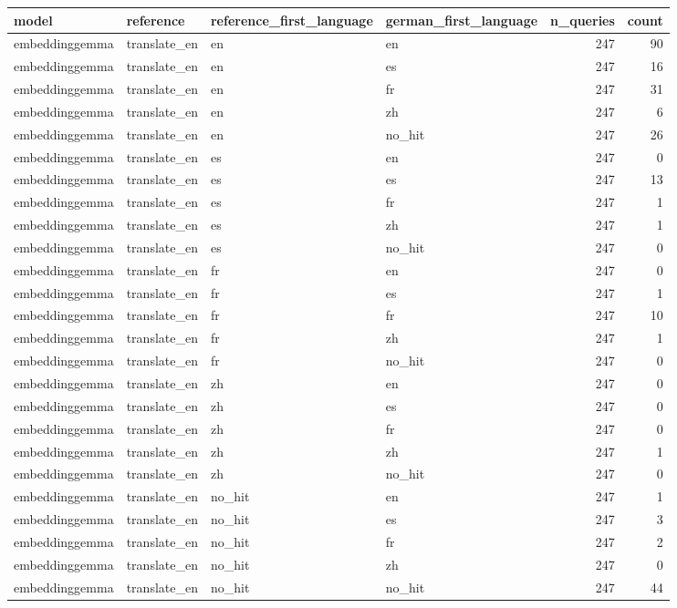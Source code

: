 \begin{tabular}{llllrr}
\toprule
model & reference & reference\_first\_language & german\_first\_language & n\_queries & count \\
\midrule
embeddinggemma & translate\_en & en & en & 247 & 90 \\
embeddinggemma & translate\_en & en & es & 247 & 16 \\
embeddinggemma & translate\_en & en & fr & 247 & 31 \\
embeddinggemma & translate\_en & en & zh & 247 & 6 \\
embeddinggemma & translate\_en & en & no\_hit & 247 & 26 \\
embeddinggemma & translate\_en & es & en & 247 & 0 \\
embeddinggemma & translate\_en & es & es & 247 & 13 \\
embeddinggemma & translate\_en & es & fr & 247 & 1 \\
embeddinggemma & translate\_en & es & zh & 247 & 1 \\
embeddinggemma & translate\_en & es & no\_hit & 247 & 0 \\
embeddinggemma & translate\_en & fr & en & 247 & 0 \\
embeddinggemma & translate\_en & fr & es & 247 & 1 \\
embeddinggemma & translate\_en & fr & fr & 247 & 10 \\
embeddinggemma & translate\_en & fr & zh & 247 & 1 \\
embeddinggemma & translate\_en & fr & no\_hit & 247 & 0 \\
embeddinggemma & translate\_en & zh & en & 247 & 0 \\
embeddinggemma & translate\_en & zh & es & 247 & 0 \\
embeddinggemma & translate\_en & zh & fr & 247 & 0 \\
embeddinggemma & translate\_en & zh & zh & 247 & 1 \\
embeddinggemma & translate\_en & zh & no\_hit & 247 & 0 \\
embeddinggemma & translate\_en & no\_hit & en & 247 & 1 \\
embeddinggemma & translate\_en & no\_hit & es & 247 & 3 \\
embeddinggemma & translate\_en & no\_hit & fr & 247 & 2 \\
embeddinggemma & translate\_en & no\_hit & zh & 247 & 0 \\
embeddinggemma & translate\_en & no\_hit & no\_hit & 247 & 44 \\

\end{tabular}
